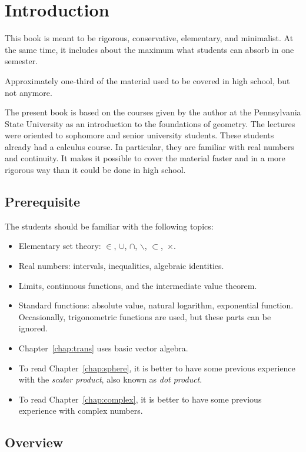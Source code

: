 \chapter*{Introduction}

This book is meant to be 
rigorous, 
conservative, 
elementary, 
and minimalist.
At the same time, it includes about the maximum what students can absorb in one semester.

Approximately one-third of the material used to be covered in high school, but not anymore.

The present book is based 
on the courses given by the author 
at the Pennsylvania State University
as an introduction to the foundations of geometry.
The lectures were oriented to sophomore and senior university students.  
These students already had a calculus course.
In particular, they are familiar with real numbers and continuity.
It makes it possible to cover the material faster 
and  in a more rigorous way
than it could be done in high school.

\section{Prerequisite}


The students should be familiar 
with the following topics:
\begin{itemize}
\item Elementary set theory: 
$\in$,
$\cup$, 
$\cap$,
$\backslash$,
$\subset$,~$\times$.
\item Real numbers: intervals, inequalities, algebraic identities.
\item Limits, continuous functions, and the intermediate value theorem.
\item Standard functions: 
absolute value, 
natural logarithm,
exponential function. 
Occasionally, trigonometric functions  are used, 
but these parts can be ignored.
\item  Chapter~\ref{chap:trans} uses basic vector algebra.
\item To read Chapter~\ref{chap:sphere}, it is better to have some previous experience with the {}\emph{scalar product}, also known as {}\emph{dot product}.
\item To read Chapter~\ref{chap:complex}, it is better to have some previous experience with complex numbers.
\end{itemize} 

\section{Overview}

